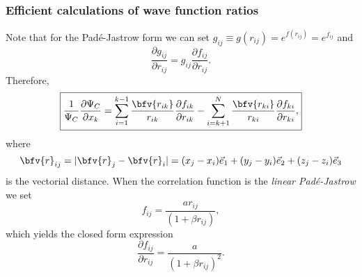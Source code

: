  {
   \frametitle{Efficient calculations of wave function ratios}
 \begin{small}
 {\scriptsize

Note that for the Pad\'e-Jastrow form we can set $g_{ij} \equiv g(r_{ij}) = e^{f(r_{ij})} = e^{f_{ij}}$ and 
\begin{equation}
\frac{\partial g_{ij}}{\partial r_{ij}} = g_{ij} \frac{\partial f_{ij}}{\partial r_{ij}}.
\end{equation}
Therefore, 
\begin{equation}\label{padeJastrowGradJasRatio}
\boxed{
\frac{1}{\Psi_{C}}\frac{\partial \Psi_{C}}{\partial x_k} =
\sum_{i=1}^{k-1}\frac{\bfv{r_{ik}}}{r_{ik}}\frac{\partial f_{ik}}{\partial r_{ik}}
-
\sum_{i=k+1}^{N}\frac{\bfv{r_{ki}}}{r_{ki}}\frac{\partial f_{ki}}{\partial r_{ki}},
}
\end{equation}
where 
\begin{equation}\label{distanceVector}
 \bfv{r}_{ij} = |\bfv{r}_j - \bfv{r}_i| = (x_j - x_i)\vec{e}_1 + (y_j - y_i)\vec{e}_2 + (z_j - z_i)\vec{e}_3
\end{equation}
is the vectorial distance. When the correlation function is the \emph{linear Pad\'e-Jastrow} we set \begin{equation}
f_{ij} = \frac{a r_{ij}}{(1 + \beta r_{ij})},
\end{equation}
which yields the closed form expression
\begin{equation}\label{analyticalPJGrad}
 \boxed{\frac{\partial f_{ij}}{\partial r_{ij}} = \frac{a}{(1 + \beta r_{ij})^2}}.
\end{equation}
 }
 \end{small}
 }



